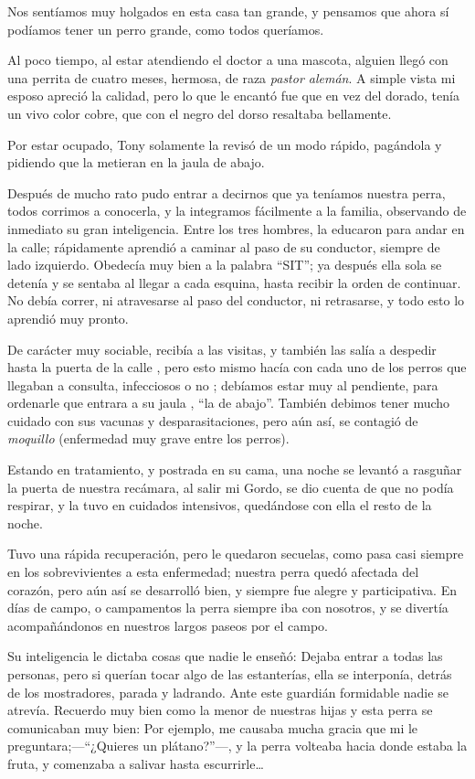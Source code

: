 \documentclass[letterpaper, 12pt]{book}
\begin{document}
Nos sentíamos muy holgados en esta casa tan grande, y pensamos  que ahora sí podíamos tener un perro grande, como todos queríamos.

Al poco tiempo, al estar atendiendo el doctor a una mascota, alguien llegó con una perrita de cuatro meses, hermosa, de raza {\it pastor alemán}. A simple vista mi esposo apreció la calidad, pero lo que le encantó fue que en vez del dorado, tenía un vivo color cobre, que con el negro del dorso resaltaba bellamente.

Por estar ocupado, Tony solamente la revisó de un modo rápido, pagándola y pidiendo que la metieran en la jaula de abajo.

Después de mucho rato pudo entrar a decirnos que ya teníamos nuestra perra, todos corrimos a conocerla, y la integramos fácilmente a la familia, observando de inmediato su gran inteligencia. Entre los tres hombres, la educaron para andar en la calle; rápidamente aprendió a caminar al paso de su conductor, siempre de lado izquierdo. Obedecía muy bien a la palabra ``SIT''; ya después ella sola se detenía y se sentaba al llegar a cada esquina, hasta recibir la orden de continuar. No debía correr, ni atravesarse al paso del conductor, ni retrasarse, y todo esto lo aprendió muy pronto. 

De carácter muy sociable, recibía a las visitas, y también las salía a despedir hasta la puerta de la calle , pero esto mismo hacía con cada uno de los perros que llegaban a consulta, infecciosos o no ; debíamos estar muy al pendiente, para ordenarle que entrara a su jaula , ``la de abajo''. También debimos tener mucho cuidado con sus vacunas y desparasitaciones, pero aún así, se contagió de {\it moquillo}  (enfermedad muy grave entre los perros).

Estando en tratamiento, y postrada en su cama, una noche se levantó a rasguñar la puerta de nuestra recámara, al salir mi Gordo, se dio cuenta de que no podía respirar, y  la tuvo en cuidados intensivos, quedándose con ella el resto de la noche.

Tuvo una rápida recuperación, pero le quedaron secuelas, como pasa casi siempre en los sobrevivientes a esta enfermedad; nuestra perra quedó afectada del corazón, pero aún así se desarrolló bien, y siempre fue alegre y participativa. En días de campo, o campamentos la perra siempre iba con nosotros, y se divertía acompañándonos en nuestros largos paseos por el campo.

Su inteligencia le dictaba cosas que nadie le enseñó: Dejaba entrar a todas las personas, pero si querían tocar algo de las estanterías, ella se interponía, detrás de los mostradores, parada y ladrando. Ante este guardián formidable nadie se atrevía.
Recuerdo muy bien como la menor de nuestras hijas y esta perra se comunicaban muy bien: Por ejemplo, me causaba mucha gracia que mi le preguntara;---``¿Quieres un plátano?''---, y la perra volteaba hacia donde estaba la fruta, y comenzaba a salivar hasta escurrirle\ldots
\end{document}
